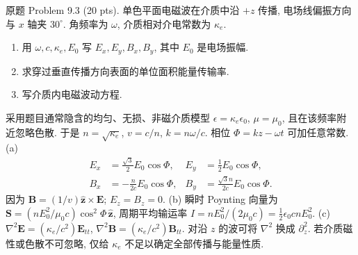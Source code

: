 \begin{exercise}\label{ps:9.3}
原题 Problem 9.3 (20 pts). 单色平面电磁波在介质中沿 $+z$ 传播, 电场线偏振方向与 $x$ 轴夹 $30^\circ$. 角频率为 $\omega$, 介质相对介电常数为 $\kappa_e$.
\begin{enumerate}[label=\alph*.]
\item 用 $\omega,c,\kappa_e,E_0$ 写 $E_x,E_y,B_x,B_y$, 其中 $E_0$ 是电场振幅.
\item 求穿过垂直传播方向表面的单位面积能量传输率.
\item 写介质内电磁波动方程.
\end{enumerate}
\end{exercise}
\begin{solution}
采用题目通常隐含的均匀、无损、非磁介质模型 $\epsilon=\kappa_e\epsilon_0$, $\mu=\mu_0$, 且在该频率附近忽略色散. 于是 $n=\sqrt{\kappa_e}$, $v=c/n$, $k=n\omega/c$. 相位 $\Phi=kz-\omega t$ 可加任意常数.
(a)
\[
\begin{aligned}
E_x&=\tfrac{\sqrt3}{2}E_0\cos\Phi,&E_y&=\tfrac12 E_0\cos\Phi,\\
B_x&=-\tfrac{n}{2c}E_0\cos\Phi,&B_y&=\tfrac{\sqrt3n}{2c}E_0\cos\Phi.
\end{aligned}
\]
因为 $\mathbf B=(1/v)\hat{\mathbf z}\times\mathbf E$; $E_z=B_z=0$.
(b) 瞬时 Poynting 向量为 $\mathbf S=(nE_0^2/\mu_0c)\cos^2\Phi\,\hat{\mathbf z}$, 周期平均输运率
$I=nE_0^2/(2\mu_0c)=\tfrac12\epsilon_0cnE_0^2$.
(c) $\nabla^2\mathbf E=(\kappa_e/c^2)\mathbf E_{tt}$, $\nabla^2\mathbf B=(\kappa_e/c^2)\mathbf B_{tt}$. 对沿 $z$ 的波可将 $\nabla^2$ 换成 $\partial_z^2$. 若介质磁性或色散不可忽略, 仅给 $\kappa_e$ 不足以确定全部传播与能量性质.
\end{solution}


